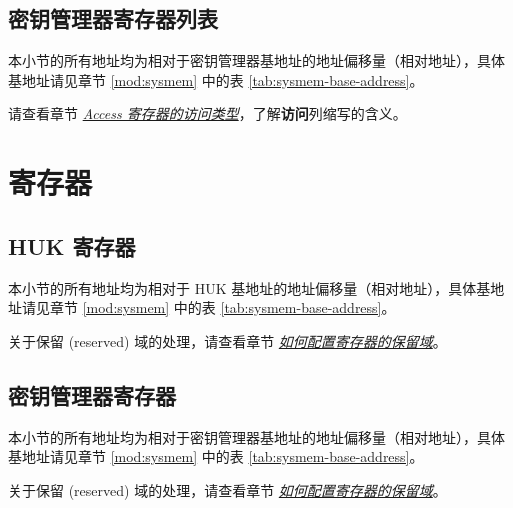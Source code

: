 \documentclass[main\_\_CN.tex]{subfiles}
\begin{document}



\subsection{密钥管理器寄存器列表}
本小节的所有地址均为相对于密钥管理器基地址的地址偏移量（相对地址），具体基地址请见章节  \ref{mod:sysmem} \textit{} 中的表  \ref{tab:sysmem-base-address}。

请查看章节  \hyperref[glossary-access-types]{\textit{Access 寄存器的访问类型}}，了解\textbf{访问}列缩写的含义。



\newpage
\section{寄存器}

\subsection{HUK 寄存器}
本小节的所有地址均为相对于 HUK 基地址的地址偏移量（相对地址），具体基地址请见章节  \ref{mod:sysmem} \textit{} 中的表  \ref{tab:sysmem-base-address}。


关于保留 (reserved) 域的处理，请查看章节 \hyperref[programming-reserved-field]{\textit{如何配置寄存器的保留域}}。



\subsection{密钥管理器寄存器}
本小节的所有地址均为相对于密钥管理器基地址的地址偏移量（相对地址），具体基地址请见章节  \ref{mod:sysmem} \textit{} 中的表  \ref{tab:sysmem-base-address}。


关于保留 (reserved) 域的处理，请查看章节 \hyperref[programming-reserved-field]{\textit{如何配置寄存器的保留域}}。


\end{document}
